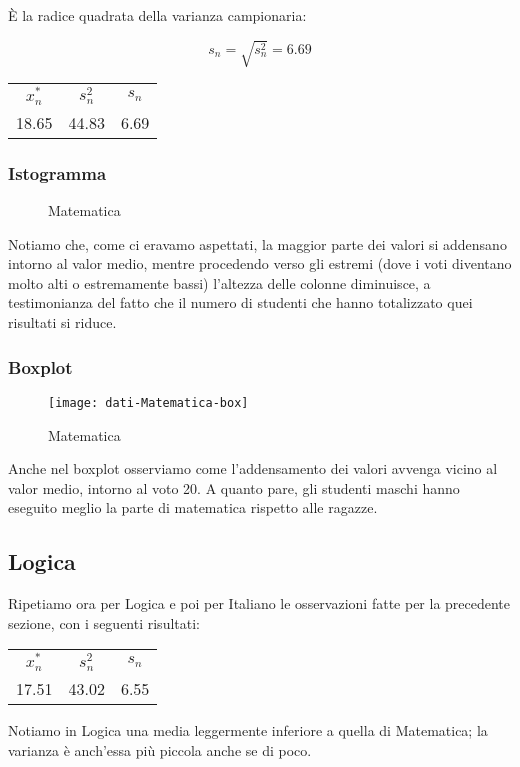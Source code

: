 È la radice quadrata della varianza campionaria:

\[
s_n = \sqrt{s_n^2} = 6.69
\]
\clearpage
\thispagestyle{empty}

\begin{center}
\begin{tabular}{ccc}
  \toprule
  \(x_{n}^{*}\) & \(s_n^2\) & \(s_n\) \\
  18.65 & 44.83 & 6.69 \\
  \bottomrule
\end{tabular}
\end{center}

\subsubsection{Istogramma}
\begin{figure}[!h]
  \caption{Matematica}
\end{figure}
Notiamo che, come ci eravamo aspettati, la maggior parte dei valori si addensano intorno al valor medio, mentre procedendo verso gli estremi (dove i voti diventano molto alti o estremamente bassi) l’altezza delle colonne diminuisce, a testimonianza del fatto che il numero di studenti che hanno totalizzato quei risultati si riduce.
\subsubsection{Boxplot}
\begin{figure}[!h]
  \centering
  \texttt{[image: dati-Matematica-box]}
  \caption{Matematica}
\end{figure}
Anche nel boxplot osserviamo come l’addensamento dei valori avvenga vicino al valor medio, intorno al voto 20. A quanto pare, gli studenti maschi hanno eseguito meglio la parte di matematica rispetto alle ragazze.
\restoregeometry
\clearpage

\thispagestyle{empty} %
\subsection{Logica}
Ripetiamo ora per Logica e poi per Italiano le osservazioni fatte per la precedente sezione, con i seguenti risultati:
\begin{center}
\begin{tabular}{ccc}
  \toprule
  \(x_{n}^{*}\) & \(s_n^2\) & \(s_n\) \\
  17.51 & 43.02 & 6.55 \\
  \bottomrule
\end{tabular}
\end{center}
Notiamo in Logica una media leggermente inferiore a quella di Matematica; la varianza è anch’essa più piccola anche se di poco.
